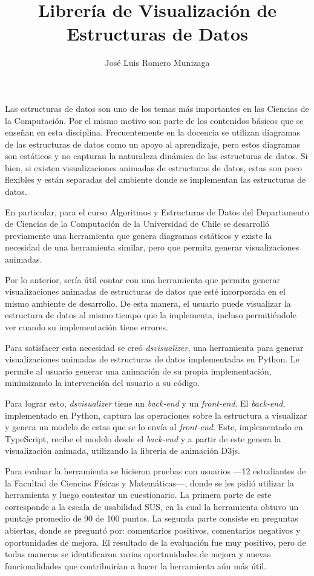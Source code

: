 \documentclass{umemoria}
\author{José Luis Romero Munizaga}
\title{Librería de Visualización de Estructuras de Datos}
\begin{document}
\frontmatter
\maketitle

\begin{resumen}
Las estructuras de datos son uno de los temas más importantes en las Ciencias de la Computación.
Por el mismo motivo son parte de los contenidos básicos que se enseñan en esta disciplina.
Frecuentemente en la docencia se utilizan diagramas de las estructuras de datos como un apoyo al aprendizaje, pero estos diagramas son estáticos y no capturan la naturaleza dinámica de las estructuras de datos.
Si bien, si existen visualizaciones animadas de estructuras de datos, estas son poco flexibles y están separadas del ambiente donde se implementan las estructuras de datos.

En particular, para el curso Algoritmos y Estructuras de Datos del Departamento de Ciencias de la Computación de la Universidad de Chile se desarrolló previamente una herramienta que genera diagramas estáticos y existe la necesidad de una herramienta similar, pero que permita generar visualizaciones animadas.

Por lo anterior, sería útil contar con una herramienta que permita generar visualizaciones animadas de estructuras de datos que esté incorporada en el mismo ambiente de desarrollo.
De esta manera, el usuario puede visualizar la estructura de datos al mismo tiempo que la implementa, incluso permitiéndole ver cuando su implementación tiene errores.

Para satisfacer esta necesidad se creó \textit{dsvisualizer}, una herramienta para generar visualizaciones animadas de estructuras de datos implementadas en Python.
Le permite al usuario generar una animación de su propia implementación, minimizando la intervención del usuario a su código.

Para lograr esto, \textit{dsvisualizer} tiene un \textit{back-end} y un \textit{front-end}. El \textit{back-end}, implementado en Python, captura las operaciones sobre la estructura a visualizar y genera un modelo de estas que se lo envía al \textit{front-end}. Este, implementado en TypeScript, recibe el modelo desde el \textit{back-end} y a partir de este genera la visualización animada, utilizando la librería de animación D3js.

Para evaluar la herramienta se hicieron pruebas con usuarios ---12 estudiantes de la Facultad de Ciencias Físicas y Matemáticas---, donde se les pidió utilizar la herramienta y luego contestar un cuestionario. La primera parte de este corresponde a la escala de usabilidad SUS, en la cual la herramienta obtuvo un puntaje promedio de 90 de 100 puntos. La segunda parte consiste en preguntas abiertas, donde se preguntó por: comentarios positivos, comentarios negativos y oportunidades de mejora. El resultado de la evaluación fue muy positivo, pero de todas maneras se identificaron varias oportunidades de mejora y nuevas funcionalidades que contribuirían a hacer la herramienta aún más útil.
\end{resumen}
\end{document}
